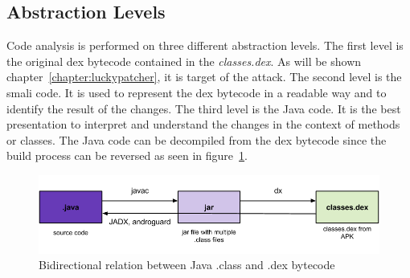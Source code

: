 \subsection{Abstraction Levels}
Code analysis is performed on three different abstraction levels.
\newline
The first level is the original dex bytecode contained in the \textit{classes.dex}.
As will be shown chapter~\ref{chapter:luckypatcher}, it is target of the attack.
\newline
The second level is the smali code.
It is used to represent the dex bytecode in a readable way and to identify the result of the changes.
\newline
The third level is the Java code.
It is the best presentation to interpret and understand the changes in the context of methods or classes.
\newline
The Java code can be decompiled from the dex bytecode since the build process can be reversed as seen in figure~\ref{fig:re1}.
\begin{figure}[h]
    \centering
    \includegraphics[width=1\textwidth]{data/re1.png}
    \caption{Bidirectional relation between Java .class and .dex bytecode \cite{andevconDalvikART}}
    \label{fig:re1}
\end{figure}

